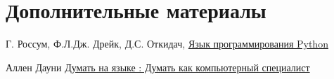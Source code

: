 \section{Дополнительные материалы}

\cite{pyotkidach} Г. Россум, Ф.Л.Дж. Дрейк, Д.С. Откидач, 
\href{http://rus-linux.net/MyLDP/BOOKS/python.pdf}{Язык программирования Python}

\cite{pythink} Аллен Дауни
\href{https://drive.google.com/file/d/0B0u4WeMjO894Q2hWV1QwOFFQOVk/view?usp=sharing}{Думать
на языке \py: Думать как компьютерный специалист}

